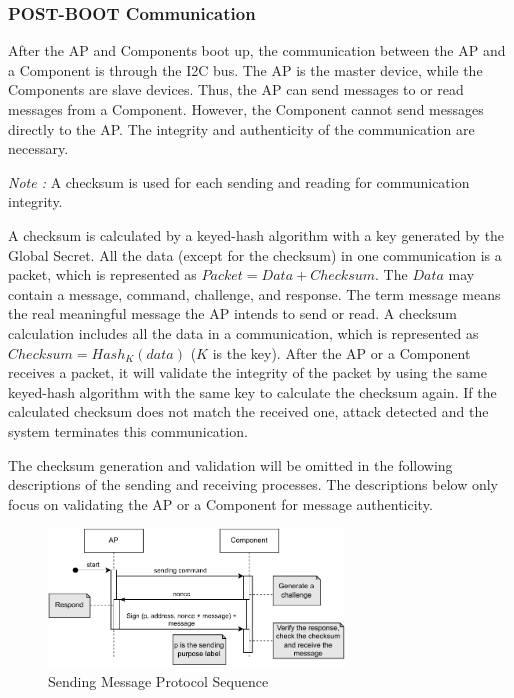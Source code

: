 \documentclass[11pt,oneside,onecolumn,letterpaper]{article}
\newcounter{alg}
\begin{document}
	\subsubsection{POST-BOOT Communication}
	After the AP and Components boot up,
	the communication between the AP and a Component is through the I2C bus.
	The AP is the master device,
	while the Components are slave devices.
	Thus,
	the AP can send messages to or read messages from a Component.
	However, the Component cannot send messages directly to the AP.
	The integrity and authenticity of the communication are necessary.
	
	\textit{Note :} A checksum is used for each sending and reading for communication integrity.
	
	A checksum is calculated by a keyed-hash algorithm with a key generated by the Global Secret.
	All the data (except for the checksum) in one communication is a packet,
	which is represented as $ Packet = Data + Checksum $.
	The $ Data $ may contain a message, command, challenge, and response.
	The term message means the real meaningful message the AP intends to send or read.
	A checksum calculation includes all the data in a communication,
	which is represented as $ Checksum = Hash_K(data) $ ($ K $ is the key).
	After the AP or a Component receives a packet,
	it will validate the integrity of the packet by using the same keyed-hash algorithm with the same key to calculate the checksum again.
	If the calculated checksum does not match the received one,
	attack detected and the system terminates this communication.
	
	The checksum generation and validation will be omitted in the following descriptions of the sending and receiving processes.
	The descriptions below only focus on validating the AP or a Component for message authenticity.
	
	\begin{figure}[h]
		\centering
		\includegraphics[width=0.7\textwidth]{pics/post1.pdf}
		\caption{Sending Message Protocol Sequence}
		\label{fig:functionality_post1}
	\end{figure}
	
\end{document}
